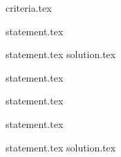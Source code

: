 {criteria.tex}

{statement.tex}

{statement.tex}
{solution.tex}

{statement.tex}

{statement.tex}

{statement.tex}

{statement.tex}
{solution.tex}